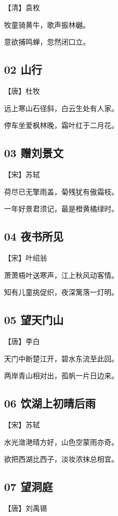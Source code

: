 \documentclass[12pt]{article}
\begin{document}
【清】袁枚

牧童骑黄牛，歌声振林樾。

意欲捕鸣蝉，忽然闭口立。

\subsection*{02 山行}

【唐】杜牧

远上寒山石径斜，白云生处有人家。

停车坐爱枫林晚，霜叶红于二月花。

\subsection*{03 赠刘景文}

【宋】苏轼

荷尽已无擎雨盖，菊残犹有傲霜枝。

一年好景君须记，最是橙黄橘绿时。

\subsection*{04 夜书所见}

【宋】叶绍翁

萧萧梧叶送寒声，江上秋风动客情。

知有儿童挑促织，夜深篱落一灯明。

\subsection*{05 望天门山}

【唐】李白

天门中断楚江开，碧水东流至此回。

两岸青山相对出，孤帆一片日边来。

\subsection*{06 饮湖上初晴后雨}

【宋】苏轼

水光潋滟晴方好，山色空蒙雨亦奇。

欲把西湖比西子，淡妆浓抹总相宜。

\subsection*{07 望洞庭}

【唐】刘禹锡
\end{document}
